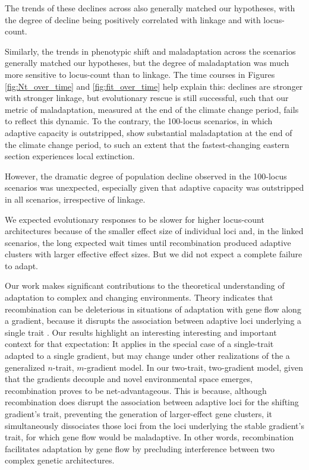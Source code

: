 \documentclass[9pt,twocolumn,twoside,lineno]{pnas-new}
\begin{document}
The trends of these declines across also generally matched our hypotheses,
with the degree of decline being positively correlated with linkage and with locus-count.

Similarly, the trends in phenotypic shift and maladaptation
across the scenarios generally matched our hypotheses,
but the degree of maladaptation was much more sensitive to
locus-count than to linkage.
The time courses in Figures \ref{fig:Nt_over_time} and \ref{fig:fit_over_time} help explain this: declines
are stronger with stronger linkage, but evolutionary
rescue is still successful, such that our metric of maladaptation,
measured at the end of the climate change period,
fails to reflect this dynamic.
To the contrary, the 100-locus scenarios,
in which adaptive capacity is outstripped,
show substantial maladaptation at the end of the climate
change period, to such an extent that the fastest-changing
eastern section experiences local extinction.

However, the dramatic degree of population decline observed in the 100-locus scenarios was unexpected,
especially given that adaptive capacity was outstripped in all scenarios, irrespective of 
linkage.

We expected evolutionary responses to be slower for higher locus-count architectures
because of the smaller effect size of individual loci and, in the linked scenarios,
the long expected wait times
until recombination produced adaptive clusters with larger effective effect sizes.
But we did not expect a complete failure to adapt.

Our work makes significant contributions to the theoretical understanding of 
adaptation to complex and changing environments.
Theory indicates that recombination can be deleterious
in situations of adaptation with gene flow
along a gradient, because it disrupts the association between adaptive loci 
underlying a single trait \cite{tigano}.
Our results highlight an interesting interesting and important context for that expectation:
It applies in the special case of a single-trait adapted to a single gradient,
but may change under other realizations of the
a generalized $n$-trait, $m$-gradient model.
In our two-trait, two-gradient model, given that the gradients decouple
and novel environmental space emerges,
recombination proves to be net-advantageous.
This is because, although recombination does disrupt the association between
adaptive loci for the shifting gradient's trait, preventing the
generation of larger-effect gene clusters,
it simultaneously dissociates those loci from the loci underlying
the stable gradient's trait, for which gene flow would be maladaptive.
In other words, recombination facilitates adaptation by gene flow
by precluding interference between two complex genetic architectures.
   
\end{document}
